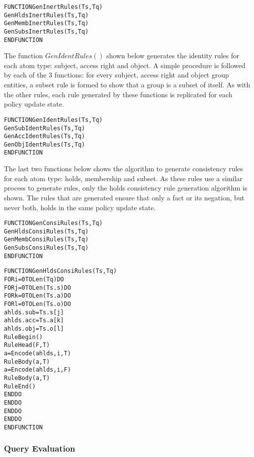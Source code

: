 \documentclass[glov2,twocolumn,final]{svjour2}
\newenvironment{vverbatim}
  {\begin{alltt}}
  {\vspace{-\baselineskip}\end{alltt}}
\begin{document}
          \begin{vverbatim}
FUNCTION GenInertRules(Ts, Tq)
  GenHldsInertRules(Ts, Tq)
  GenMembInertRules(Ts, Tq)
  GenSubsInertRules(Ts, Tq)
ENDFUNCTION
          \end{vverbatim}

          The function $GenIdentRules()$ shown below generates the identity
          rules for each atom type: subject, access right and object. A simple
          procedure is followed by each of the 3 functions: for every subject,
          access right and object group entities, a subset rule is formed to
          show that a group is a subset of itself. As with the other rules,
          each rule generated by these functions is replicated for each policy
          update state.

          \begin{vverbatim}
FUNCTION GenIdentRules(Ts, Tq)
  GenSubIdentRules(Ts, Tq)
  GenAccIdentRules(Ts, Tq)
  GenObjIdentRules(Ts, Tq)
ENDFUNCTION
          \end{vverbatim}

          The last two functions below shows the algorithm to generate
          consistency rules for each atom type: holds, membership and subset.
          As these rules use a similar process to generate rules, only the
          holds consistency rule generation algorithm is shown. The rules that
          are generated ensure that only a fact or its negation, but never
          both, holds in the same policy update state.

          \begin{vverbatim}
FUNCTION GenConsiRules(Ts, Tq)
  GenHldsConsiRules(Ts, Tq)
  GenMembConsiRules(Ts, Tq)
  GenSubsConsiRules(Ts, Tq)
ENDFUNCTION
          \end{vverbatim}

          \begin{vverbatim}
FUNCTION GenHldsConsiRules(Ts, Tq)
  FOR i = 0 TO Len(Tq) DO
    FOR j = 0 TO Len(Ts.s) DO
      FOR k = 0 TO Len(Ts.a) DO
        FOR l = 0 TO Len(Ts.o) DO
          ahlds.sub = Ts.s[j]
          ahlds.acc = Ts.a[k]
          ahlds.obj = Ts.o[l]
          RuleBegin()
          RuleHead(F, T)
          a = Encode(ahlds, i, T)
          RuleBody(a, T)
          a = Encode(ahlds, i, F)
          RuleBody(a, T)
          RuleEnd()
        ENDDO
      ENDDO
    ENDDO
  ENDDO
ENDFUNCTION
          \end{vverbatim}

      \subsubsection{Query Evaluation}
\end{document}
